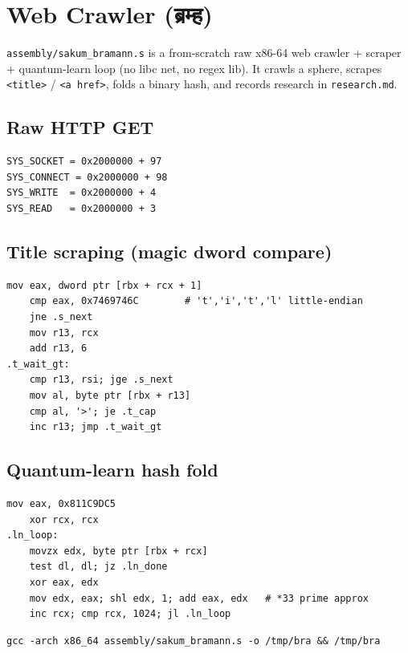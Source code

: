 \section{Web Crawler (ब्रम्ह)}\label{ch:crawler}

\texttt{assembly/sakum\_bramann.s} is a from-scratch raw x86-64 web
crawler + scraper + quantum-learn loop (no libc net, no regex lib).  It
crawls a sphere, scrapes \texttt{<title>} / \texttt{<a href>}, folds a
binary hash, and records research in \texttt{research.md}.

\subsection{Raw HTTP GET}

\begin{lstlisting}[language=SakumAsm,caption={Socket bases (sakum\_bramann.s).}]
SYS_SOCKET = 0x2000000 + 97
SYS_CONNECT = 0x2000000 + 98
SYS_WRITE  = 0x2000000 + 4
SYS_READ   = 0x2000000 + 3
\end{lstlisting}

\subsection{Title scraping (magic dword compare)}

\begin{lstlisting}[language=SakumAsm,caption={<title> capture (sakum\_bramann.s:195).}]
    mov eax, dword ptr [rbx + rcx + 1]
    cmp eax, 0x7469746C        # 't','i','t','l' little-endian
    jne .s_next
    mov r13, rcx
    add r13, 6
.t_wait_gt:
    cmp r13, rsi; jge .s_next
    mov al, byte ptr [rbx + r13]
    cmp al, '>'; je .t_cap
    inc r13; jmp .t_wait_gt
\end{lstlisting}

\subsection{Quantum-learn hash fold}

\begin{lstlisting}[language=SakumAsm,caption={FNV-1a sphere fold (sakum\_bramann.s:313).}]
    mov eax, 0x811C9DC5
    xor rcx, rcx
.ln_loop:
    movzx edx, byte ptr [rbx + rcx]
    test dl, dl; jz .ln_done
    xor eax, edx
    mov edx, eax; shl edx, 1; add eax, edx   # *33 prime approx
    inc rcx; cmp rcx, 1024; jl .ln_loop
\end{lstlisting}

\begin{verbatim}
gcc -arch x86_64 assembly/sakum_bramann.s -o /tmp/bra && /tmp/bra
\end{verbatim}

